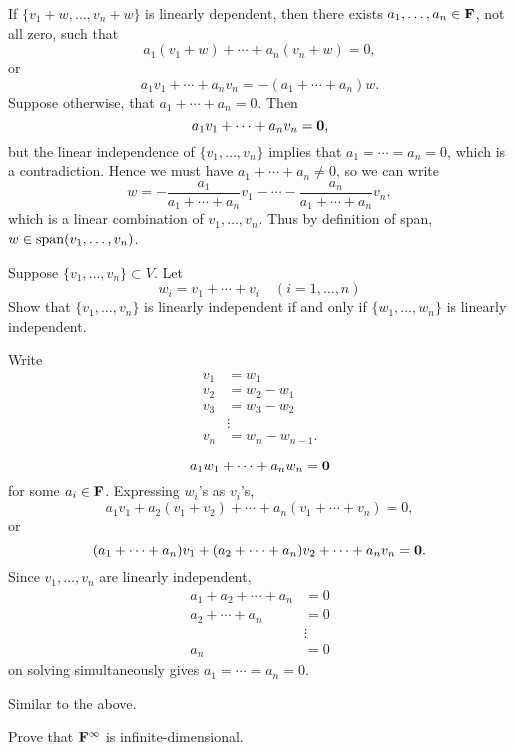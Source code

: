 \begin{solution}
If $\{v_1+w,\dots,v_n+w\}$ is linearly dependent, then there exists $a_1,\dots,a_n\in\mathbf F$, not all zero, such that
\[a_1(v_1+w)+\cdots+a_n(v_n+w)=0,\]
or
\[a_1v_1+\cdots+a_nv_n=-(a_1+\cdots+a_n)w.\]
Suppose otherwise, that $a_1+\cdots+a_n=0$. Then
\[a_1v_1+\cdots+a_nv_n=\vb{0},\]
but the linear independence of $\{v_1,\dots,v_n\}$ implies that $a_1=\cdots=a_n=0$, which is a contradiction. Hence we must have $a_1+\cdots+a_n\neq0$, so we can write
\[w=-\frac{a_1}{a_1+\cdots+a_n}v_1-\cdots-\frac{a_n}{a_1+\cdots+a_n}v_n,\]
which is a linear combination of $v_1,\dots,v_n$. Thus by definition of span, $w\in\operatorname{span}(v_1,\dots,v_n)$.
\end{solution}

\begin{prbm}
Suppose $\{v_1,\dots,v_n\}\subset V$. Let
\[w_i=v_1+\cdots+v_i\quad(i=1,\dots,n)\]
Show that $\{v_1,\dots,v_n\}$ is linearly independent if and only if $\{w_1,\dots,w_n\}$ is linearly independent.
\end{prbm}

\begin{solution}
Write
\begin{align*}
v_1&=w_1\\
v_2&=w_2-w_1\\
v_3&=w_3-w_2\\
&\vdots\\
v_n&=w_n-w_{n-1}.
\end{align*}

\fbox{$\implies$}
\[a_1w_1+\cdots+a_nw_n=\vb{0}\]
for some $a_i\in\mathbf F$. Expressing $w_i$'s as $v_i$'s,
\[a_1v_1+a_2(v_1+v_2)+\cdots+a_n(v_1+\cdots+v_n)=0,\]
or
\[(a_1+\cdots+a_n)v_1+(a_2+\cdots+a_n)v_2+\cdots+a_nv_n=\vb{0}.\]
Since $v_1,\dots,v_n$ are linearly independent,
\begin{align*}
a_1+a_2+\cdots+a_n&=0\\
a_2+\cdots+a_n&=0\\
&\vdots\\
a_n&=0
\end{align*}
on solving simultaneously gives $a_1=\cdots=a_n=0$.

\fbox{$\impliedby$} Similar to the above.
\end{solution}

\begin{prbm}
Prove that $\mathbf F^\infty$ is infinite-dimensional.
\end{prbm}


